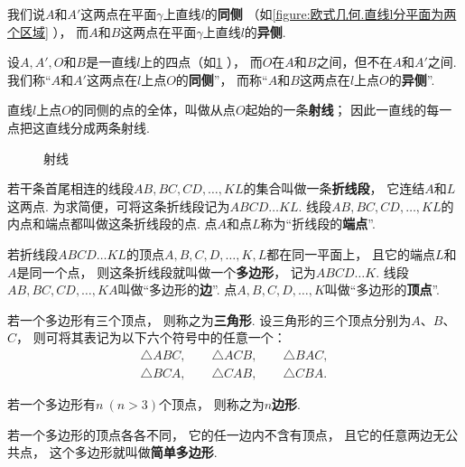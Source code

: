 \begin{definition}
我们说\(A\)和\(A'\)这两点在平面\(\gamma\)上直线\(l\)的\textbf{同侧}%
（如\cref{figure:欧式几何.直线l分平面为两个区域} ），%
而\(A\)和\(B\)这两点在平面\(\gamma\)上直线\(l\)的\textbf{异侧}.%
\end{definition}

\begin{definition}
设\(A,A',O\)和\(B\)是一直线\(l\)上的四点（如\cref{figure:欧式几何.射线} ），%
而\(O\)在\(A\)和\(B\)之间，但不在\(A\)和\(A'\)之间.
我们称“\(A\)和\(A'\)这两点在\(l\)上点\(O\)的\textbf{同侧}”，%
而称“\(A\)和\(B\)这两点在\(l\)上点\(O\)的\textbf{异侧}”.

直线\(l\)上点\(O\)的同侧的点的全体，叫做从点\(O\)起始的一条\textbf{射线}；
因此一直线的每一点把这直线分成两条射线.
\begin{figure}[ht]
\centering
{}
\caption{射线}
\label{figure:欧式几何.射线}
\end{figure}
\end{definition}

\begin{definition}
若干条首尾相连的线段\(AB,BC,CD,\dotsc,KL\)的集合叫做一条\textbf{折线段}，%
它连结\(A\)和\(L\)这两点.
为求简便，可将这条折线段记为\(ABCD \dotso KL\).
线段\(AB,BC,CD,\dotsc,KL\)的内点和端点都叫做这条折线段的点.
点\(A\)和点\(L\)称为“折线段的\textbf{端点}”.

若折线段\(ABCD \dotso KL\)的顶点\(A,B,C,D,\dotsc,K,L\)都在同一平面上，%
且它的端点\(L\)和\(A\)是同一个点，%
则这条折线段就叫做一个\textbf{多边形}，%
记为\(ABCD \dotso K\).
线段\(AB,BC,CD,\dotsc,KA\)叫做“多边形的\textbf{边}”.
点\(A,B,C,D,\dotsc,K\)叫做“多边形的\textbf{顶点}”.

若一个多边形有三个顶点，%
则称之为\textbf{三角形}.
设三角形的三个顶点分别为\(A\)、\(B\)、\(C\)，%
则可将其表记为以下六个符号中的任意一个：
\[
\begin{split}
\triangle ABC, \qquad
\triangle ACB, \qquad
\triangle BAC, \\
\triangle BCA, \qquad
\triangle CAB, \qquad
\triangle CBA.
\end{split}
\]

若一个多边形有\(n\ (n>3)\)个顶点，%
则称之为\(n\)\textbf{边形}.

若一个多边形的顶点各各不同，%
它的任一边内不含有顶点，%
且它的任意两边无公共点，%
这个多边形就叫做\textbf{简单多边形}.
\end{definition}


